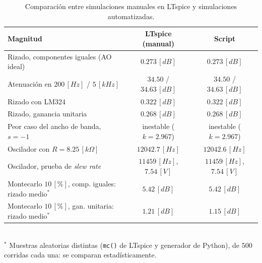 \begin{table}[H]
    \centering
    \caption{Comparación entre simulaciones manuales en LTspice y simulaciones automatizadas.}
    \label{tab:validacion}
    \begin{tabular}{|l|c|c|}
        \hline
        \textbf{Magnitud} & \textbf{LTspice (manual)} & \textbf{Script} \\
        \hline
        Rizado, componentes iguales (AO ideal) & $0.273 \, [dB]$ & $0.273 \, [dB]$ \\
        Atenuación en $200 \, [Hz]$ / $5 \, [kHz]$ & $34.50$ / $34.63 \, [dB]$ & $34.50$ / $34.63 \, [dB]$ \\
        Rizado con LM324 & $0.322 \, [dB]$ & $0.322 \, [dB]$ \\
        Rizado, ganancia unitaria & $0.268 \, [dB]$ & $0.268 \, [dB]$ \\
        Peor caso del ancho de banda, $s = -1$ & inestable ($k = 2.967$) & inestable ($k = 2.967$) \\
        Oscilador con $R = 8.25 \, [k\Omega]$ & $12042.7 \, [Hz]$ & $12042.6 \, [Hz]$ \\
        Oscilador, prueba de \textit{slew rate} & $11459 \, [Hz]$, $7.54 \, [V]$ & $11459 \, [Hz]$, $7.54 \, [V]$ \\
        Montecarlo $10 \, [\%]$, comp. iguales: rizado medio$^{*}$ & $5.42 \, [dB]$ & $5.42 \, [dB]$ \\
        Montecarlo $10 \, [\%]$, gan. unitaria: rizado medio$^{*}$ & $1.21 \, [dB]$ & $1.15 \, [dB]$ \\
        \hline
    \end{tabular}
    \\[1mm]
    {\footnotesize $^{*}$ Muestras aleatorias distintas (\texttt{mc()} de LTspice y generador de Python), de $500$ corridas cada una: se comparan estadísticamente.}
\end{table}

